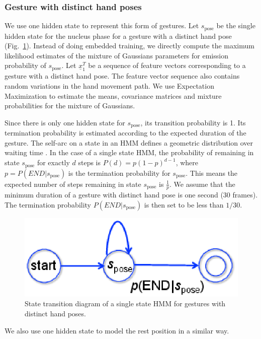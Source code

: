 \documentclass[conference]{IEEEtran}
\begin{document}
\subsubsection{Gesture with distinct hand poses}
We use one hidden state to represent this form of gestures. Let
$s_{\text{pose}}$ be the single hidden state for the nucleus phase for a gesture
with a distinct hand pose (Fig.~\ref{fig:single}). Instead of doing embedded
training, we directly compute the maximum likelihood estimates of the mixture of
Gaussians parameters for emission probability of  $s_{\text{pose}}$. Let
$\underline{x}_1^T$ be a sequence of feature vectors corresponding to a gesture with a distinct hand pose. The feature vector sequence also contains random variations in the hand movement
path. 
We use Expectation Maximization to estimate the means, covariance matrices and
mixture probabilities for the mixture of Gaussians.

Since there is only one hidden state for $s_{\text{pose}}$, its transition
probability is 1. Its termination probability is estimated according to the
expected duration of the gesture. The self-arc on a state in an HMM defines a 
geometric distribution over waiting time \cite{murphy02}. In the case of a
single state HMM, the probability of remaining in state $s_{\text{pose}}$ for
exactly $d$ steps is $P(d) = p(1-p)^{d - 1}$, where $p = P(END|s_\text{pose})$
is the termination probability for $s_{\text{pose}}$. This means the expected
number of steps remaining in state $s_{\text{pose}}$ is $\frac{1}{p}$. We assume
that the minimum duration of a gesture with distinct hand pose is one second
(30 frames). The termination probability $P(END|s_\text{pose})$ is then set to
be less than $1/30$.

\begin{figure}[t]
\centering
\includegraphics[width=0.5\columnwidth]{fig/single_state.ps}
\caption{State transition diagram of a single state HMM for gestures with
distinct hand poses. }
\label{fig:single}
\end{figure}

We also use one hidden state to model the rest position in a similar way.
\end{document}
